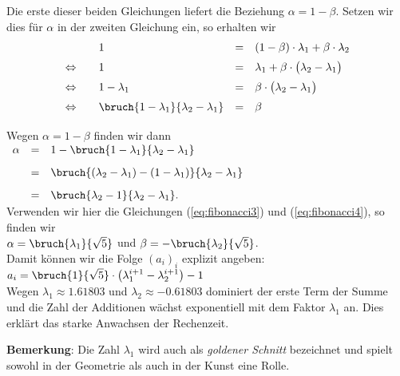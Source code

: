 Die erste dieser beiden Gleichungen liefert die Beziehung $\alpha = 1 - \beta$.  Setzen
wir dies für $\alpha$ in der zweiten Gleichung ein, so erhalten wir 
\[
\begin{array}{clcl}
                      &  1 & = & (1 - \beta)\cdot  \lambda_1 + \beta \cdot \lambda_2 \\[0.2cm]
\Leftrightarrow\quad  &  1 & = & 
 \lambda_1  + \beta \cdot \bigl( \lambda_2 - \lambda_1\bigr) \\[0.2cm]
\Leftrightarrow\quad  &  1 - \lambda_1 & = & \beta \cdot \bigl(\lambda_2 - \lambda_1\bigr)  \\[0.2cm]
\Leftrightarrow\quad  &  \bruch{1 - \lambda_1}{\lambda_2 - \lambda_1} & = & \beta \\[0.2cm]
\end{array}
\]
Wegen $\alpha = 1 - \beta$ finden wir dann \\[0.2cm]
\hspace*{1.3cm} 
$
\begin{array}[t]{lcl}
\alpha & = & 1 - \bruch{1 - \lambda_1}{\lambda_2 - \lambda_1} \\[0.3cm]
       & = & \bruch{(\lambda_2 - \lambda_1) -(1 - \lambda_1)}{\lambda_2 - \lambda_1} \\[0.3cm]
       & = & \bruch{\lambda_2 - 1}{\lambda_2 - \lambda_1}.
\end{array}
$
\\[0.2cm]
Verwenden  wir hier die Gleichungen (\ref{eq:fibonacci3}) und (\ref{eq:fibonacci4}), so
finden wir \\[0.2cm] 
\hspace*{1.3cm} 
$\alpha = \bruch{\lambda_1}{\sqrt{5}} $ \quad und \quad $\beta  = -\bruch{\lambda_2}{\sqrt{5}}$. \\[0.2cm]
Damit können wir die Folge $(a_i)_i$ explizit angeben: \\[0.2cm]
\hspace*{1.3cm} 
$\displaystyle 
   a_i = \bruch{1}{\sqrt{5}} \cdot \left( \lambda_1^{i+1} - \lambda_2^{i+1} \right) - 1$ \\[0.2cm]
Wegen $\lambda_1\approx 1.61803$ und $\lambda_2 \approx - 0.61803$ dominiert der erste Term
der Summe und die Zahl der Additionen wächst exponentiell mit dem Faktor $\lambda_1$ an.
Dies erklärt das starke Anwachsen der Rechenzeit.
\vspace*{0.3cm}

\noindent
\textbf{Bemerkung}:  Die Zahl $\lambda_1$ wird auch als \emph{goldener Schnitt} bezeichnet
und spielt sowohl in der Geometrie als auch in der Kunst eine Rolle.
\vspace*{0.3cm}

